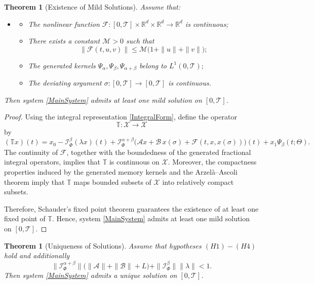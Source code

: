 \documentclass[11pt]{article}
\numberwithin{equation}{section}
\newtheorem{theorem}[definition]{Theorem}
\begin{document}
\begin{theorem}[Existence of Mild Solutions]
Assume that:
\begin{itemize}[itemsep=2pt,topsep=2pt]
\item[]
\begin{itemize}

\item[(G1)]
The nonlinear function
\(
\mathcal{F}:[0,\mathcal{T}]\times\mathbb R^{d}\times\mathbb R^{d}\to\mathbb R^{d}
\)
is continuous;

\item[(G2)]
There exists a constant \(\mathcal{M}>0\) such that
\[
\|\mathcal{F}(t,u,v)\|
\le
\mathcal{M}
\big(
1+\|u\|+\|v\|
\big);
\]

\item[(G3)]
The generated kernels
\(
\Psi_{\alpha},
\Psi_{\beta},
\Psi_{\alpha+\beta}
\)
belong to
\(
L^{1}(0,\mathcal{T});
\)

\item[(G4)]
The deviating argument
\(
\sigma:[0,\mathcal{T}]\to[0,\mathcal{T}]
\)
is continuous.

\end{itemize}
\end{itemize}
Then system \eqref{MainSystem} admits at least one mild solution on \([0,\mathcal{T}]\).
\end{theorem}

\begin{proof}
Using the integral representation \eqref{IntegralForm}, define the operator
\[
\mathbb{T}:\mathcal{X} \to \mathcal{X}
\]
by
\[
(\mathbb{T} x)(t)
=
x_{0}
-
\mathcal I_{\Phi}^{\beta}
(\lambda x)(t)
+
\mathcal I_{\Phi}^{\alpha+\beta}
\Big(
\mathcal{A}x
+
\mathcal{B}\,x(\sigma)
+
\mathcal{F}(t,x,x(\sigma))
\Big)(t)
+
x_{1}\Psi_{\beta}(t;\Theta).
\]
The continuity of \(\mathcal{F}\), together with the boundedness of the generated fractional integral operators, implies that \(\mathbb{T}\) is continuous on \(\mathcal{X}\). Moreover, the compactness properties induced by the generated memory kernels and the Arzelà--Ascoli theorem imply that \(\mathbb{T}\) maps bounded subsets of \(\mathcal{X}\) into relatively compact subsets.

Therefore, Schauder's fixed point theorem guarantees the existence of at least one fixed point of \(\mathbb{T}\). Hence, system \eqref{MainSystem} admits at least one mild solution on \([0,\mathcal{T}]\).
\end{proof}

\begin{theorem}[Uniqueness of Solutions]
Assume that hypotheses \((H1)-(H4)\) hold and additionally
\[
\|
\mathcal I_{\Phi}^{\alpha+\beta}
\|
\big(
\|\mathcal{A}\|
+
\|\mathcal{B}\|
+
L
\big)
+
\|
\mathcal I_{\Phi}^{\beta}
\|
\|\lambda\|
<1.
\]
Then system \eqref{MainSystem} admits a unique solution on \([0,\mathcal{T}]\).
\end{theorem}
\end{document}

